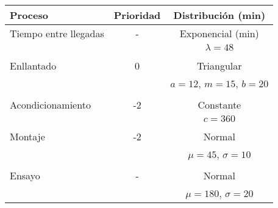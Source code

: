 \documentclass[varwidth=\maxdimen]{standalone}
\begin{document}
\begin{tabular}{ l c c }
	\toprule
	Proceso	& Prioridad	& Distribución (min) \\
	\midrule
	Tiempo entre llegadas	& -		& Exponencial (min) \\
							&		& $\lambda=48$ \\
							\\
	Enllantado				& 0		& Triangular \\
							&		& $a=12$, $m=15$, $b=20$ \\
							\\
	Acondicionamiento		& -2	& Constante \\
							&		& $c=360$ \\
							\\
	Montaje					& -2	& Normal \\
							&		& $\mu=45$, $\sigma=10$ \\
							\\
	Ensayo					& -		& Normal \\
							&		& $\mu=180$, $\sigma=20$ \\
	\bottomrule
\end{tabular}
\end{document}
